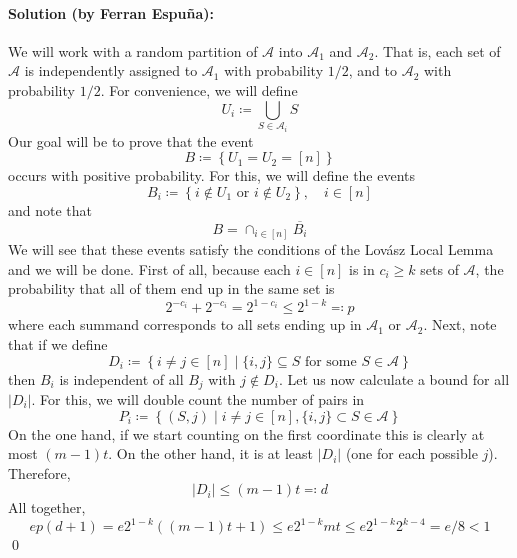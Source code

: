 \documentclass{amsart}
\theoremstyle{plain}
\theoremstyle{definition}
\begin{document}
    \paragraph{\textbf{Solution (by Ferran Espuña):}}
    We will work with a random partition of $\mathcal{A}$ into $\mathcal{A}_1$ and $\mathcal{A}_2$.
    That is, each set of $\mathcal{A}$ is independently assigned to $\mathcal{A}_1$ with probability $1/2$,
    and to $\mathcal{A}_2$ with probability $1/2$.
    For convenience, we will define
    \[
        U_i \coloneqq \bigcup_{S \in \mathcal{A}_i}S
    \]
    Our goal will be to prove that the event
    \[
        B \coloneqq \left\{ U_1 = U_2 = [n]\right\}
    \]
    occurs with positive probability.
    For this, we will define the events
    \[
        B_i \coloneqq \left\{ i \notin U_1 \text{ or } i \notin U_2 \right\}, \quad i \in [n]
    \]
    and note that \[
        B = \cap_{i \in [n]} \overline{B_i}
    \]
    We will see that these events satisfy the conditions of the Lovász Local Lemma and we will be done.
    First of all, because each $i \in [n]$ is in $c_i \geq k$ sets of $\mathcal{A}$,
    the probability that all of them end up in the same set is
    \[
        2^{-c_i} + 2^{-c_i} = 2^{1-c_i} \leq 2^{1-k} \eqqcolon p
    \]
    where each summand corresponds to all sets ending up in $\mathcal{A}_1$ or $\mathcal{A}_2$.
    Next, note that if we define \[
        D_i \coloneqq \left\{
        i \neq j \in [n] \mid
        \{i, j\} \subseteq S \text{ for some } S \in \mathcal{A}
        \right\}
    \]
    then $B_i$ is independent of all $B_j$ with $j \notin D_i$.
    Let us now calculate a bound for all $|D_i|$.
    For this, we will double count the number of pairs in \[
        P_i \coloneqq \left\{ (S, j) \mid i \neq j \in [n], \{i, j\} \subset S \in \mathcal{A} \right\}
    \]
    On the one hand,
    if we start counting on the first coordinate this is clearly at most $(m - 1)t$.
    On the other hand, it is at least $|D_i|$ (one for each possible $j$). Therefore, \[
        |D_i| \leq (m - 1)t \eqqcolon d
    \]
    All together,\[
        ep(d+1) = e2^{1-k}((m-1)t + 1) \leq e2^{1-k}mt \leq e2^{1-k}2^{k-4} = e/8 < 1
    \]
    \qed
\end{document}
